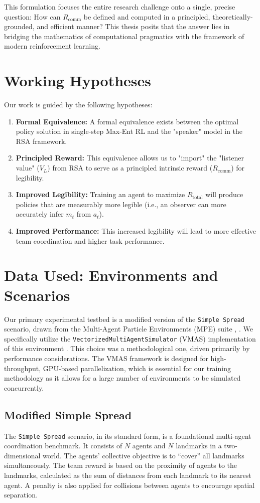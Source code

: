 \documentclass[12pt, a4paper]{report}
\newcommand{\Rcomm}{R_{\text{comm}}}
\newcommand{\Rtotal}{R_{\text{total}}}
\newcommand{\VL}{V_L}
\begin{document}
This formulation focuses the entire research challenge onto a single, precise question: How can $\Rcomm$ be defined and computed in a principled, theoretically-grounded, and efficient manner? This thesis posits that the answer lies in bridging the mathematics of computational pragmatics with the framework of modern reinforcement learning.

\section{Working Hypotheses}
Our work is guided by the following hypotheses:
\begin{enumerate}
    \item \textbf{Formal Equivalence:} A formal equivalence exists between the optimal policy solution in single-step Max-Ent RL and the "speaker" model in the RSA framework.
    \item \textbf{Principled Reward:} This equivalence allows us to "import" the "listener value" ($\VL$) from RSA to serve as a principled intrinsic reward ($\Rcomm$) for legibility.
    \item \textbf{Improved Legibility:} Training an agent to maximize $\Rtotal$ will produce policies that are measurably more legible (i.e., an observer can more accurately infer $m_t$ from $a_t$).
    \item \textbf{Improved Performance:} This increased legibility will lead to more effective team coordination and higher task performance.
\end{enumerate}

\section{Data Used: Environments and Scenarios}
Our primary experimental testbed is a modified version of the \texttt{Simple Spread} scenario, drawn from the Multi-Agent Particle Environments (MPE) suite \cite{lowe2017multi}, \cite{mordatch2017emergence}. We specifically utilize the \texttt{VectorizedMultiAgentSimulator} (VMAS) implementation of this environment \cite{bettini2022vmas}. This choice was a methodological one, driven primarily by performance considerations. The VMAS framework is designed for high-throughput, GPU-based parallelization, which is essential for our training methodology as it allows for a large number of environments to be simulated concurrently.

\subsection{Modified Simple Spread}
The \texttt{Simple Spread} scenario, in its standard form, is a foundational multi-agent coordination benchmark. It consists of $N$ agents and $N$ landmarks in a two-dimensional world. The agents' collective objective is to ``cover'' all landmarks simultaneously. The team reward is based on the proximity of agents to the landmarks, calculated as the sum of distances from each landmark to its nearest agent. A penalty is also applied for collisions between agents to encourage spatial separation.
\end{document}
